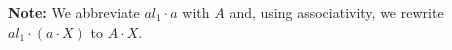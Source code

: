 {\bf Note:} We abbreviate $al_{1} \cdot a$ with $A$ and, using associativity, we rewrite $al_{1} \cdot (a \cdot X)$ to $A \cdot X$.